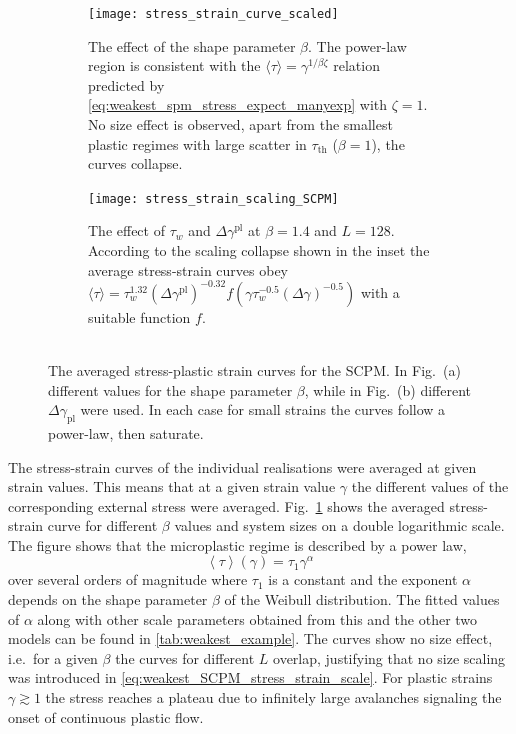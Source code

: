 \begin{figure}[htbp] 
  \centering
  \begin{subfigure}[b]{0.44\textwidth}
    \texttt{[image: stress\_strain\_curve\_scaled]}
    \caption{The effect of the shape parameter $\beta$. The power-law region is consistent with the $\langle \tau \rangle = \gamma^{1/\beta \zeta}$ relation predicted by \cref{eq:weakest_spm_stress_expect_manyexp} with $\zeta=1$. No size effect is observed, apart from the smallest plastic regimes with large scatter in ${\tau _{{\text{th}}}}$ ($\beta=1$), the curves collapse.}
    \label{fig:weakest_avg_stress_strain_SCPM_beta}   
  \end{subfigure}                  \hspace{0.01\textwidth}
  \begin{subfigure}[b]{0.53\textwidth}
    \texttt{[image: stress\_strain\_scaling\_SCPM]}
    \caption{The effect of $\tau_w$ and $\Delta \gamma^\text{pl}$ at $\beta=1.4$ and $L=128$. According to the scaling collapse shown in the inset the average stress-strain curves obey $\langle \tau \rangle = \tau_w^{1.32} (\Delta \gamma^\text{pl})^{-0.32} f(\gamma \tau_w^{-0.5} (\Delta \gamma)^{-0.5})$ with a suitable function $f$.\\ \\}
    \label{fig:weakest_avg_stress_strain_SCPM_I}
  \end{subfigure}
  \caption[Averaged stress-strain curves for the SCPM]{The averaged stress-plastic strain curves for the SCPM. In Fig.~(a) different values for the shape parameter $\beta$, while in Fig.~(b) different $\Delta {\gamma _{{\text{pl}}}}$ were used. In each case for small strains the curves follow a power-law, then saturate.}
  \label{fig:weakest_avg_stress_strain_SCPM}
\end{figure}

The stress-strain curves of the individual realisations were averaged at given strain values. This means that at a given strain value $\gamma$ the different values of the corresponding external stress were averaged. Fig.~\ref{fig:weakest_avg_stress_strain_SCPM_beta} shows the averaged stress-strain curve for different $\beta$ values and system sizes on a double logarithmic scale. The figure shows that the microplastic regime is described by a power law, 
\begin{equation} \label{eq:weakest_SCPM_stress_strain_scale}
\left\langle \tau  \right\rangle \left( \gamma  \right) = {\tau _1}{\gamma ^\alpha }
\end{equation}
over several orders of magnitude where $\tau_1$ is a constant and the exponent $\alpha$ depends on the shape parameter $\beta$ of the Weibull distribution. The fitted values of $\alpha$ along with other scale parameters obtained from this and the other two models can be found in \cref{tab:weakest_example}. The curves show no size effect, i.e.\ for a given $\beta$ the curves for different $L$ overlap, justifying that no size scaling was introduced in \cref{eq:weakest_SCPM_stress_strain_scale}. For plastic strains $\gamma \gtrsim 1$ the stress reaches a plateau due to infinitely large avalanches signaling the onset of continuous plastic flow.

